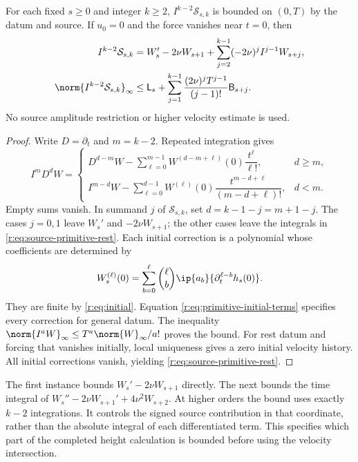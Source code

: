 \begin{proposition}
\label{r:prop:source-primitive}
For each fixed \(s\ge0\) and integer \(k\ge2\),
\(I^{k-2}\mathcal S_{s,k}\) is bounded on \((0,T)\) by the datum and
source. If \(u_0=0\) and the force vanishes near \(t=0\), then
\begin{equation}
 \begin{aligned}
 I^{k-2}\mathcal S_{s,k}
 &=W_s'-2\nu W_{s+1}
 +\sum_{j=2}^{k-1}(-2\nu)^jI^{j-1}W_{s+j},\\
 \norm{I^{k-2}\mathcal S_{s,k}}_\infty
 &\le\mathsf L_s+
 \sum_{j=1}^{k-1}\frac{(2\nu)^jT^{j-1}}{(j-1)!}\mathsf B_{s+j}.
 \end{aligned}
 \label{r:eq:source-primitive-rest}
\end{equation}
No source amplitude restriction or higher velocity estimate is used.
\end{proposition}

\begin{proof}
Write \(D=\partial_t\) and \(m=k-2\). Repeated integration gives
\begin{equation}
 I^mD^dW=
 \begin{cases}
 D^{d-m}W-\displaystyle\sum_{\ell=0}^{m-1}
 W^{(d-m+\ell)}(0)\dfrac{t^\ell}{\ell!},&d\ge m,\\[5pt]
 I^{m-d}W-\displaystyle\sum_{\ell=0}^{d-1}
 W^{(\ell)}(0)\dfrac{t^{m-d+\ell}}{(m-d+\ell)!},&d<m.
 \end{cases}
 \label{r:eq:primitive-initial-terms}
\end{equation}
Empty sums vanish. In summand \(j\) of \(\mathcal S_{s,k}\), set
\(d=k-1-j=m+1-j\). The cases \(j=0,1\) leave \(W_s'\) and
\(-2\nu W_{s+1}\); the other cases leave the integrals in
\eqref{r:eq:source-primitive-rest}. Each initial correction is a polynomial
whose coefficients are determined by
\[
 W_s^{(\ell)}(0)=\sum_{b=0}^{\ell}\binom\ell b
 \ip{a_b}{\partial_t^{\ell-b}h_s(0)}.
\]
They are finite by \eqref{r:eq:initial}. Equation
\eqref{r:eq:primitive-initial-terms} specifies every correction for general
datum. The inequality \(\norm{I^aW}_\infty\le T^a\norm{W}_\infty/a!\)
proves the bound. For rest datum and forcing that vanishes initially,
local uniqueness gives a zero initial velocity history. All initial
corrections vanish, yielding \eqref{r:eq:source-primitive-rest}.
\end{proof}

The first instance bounds \(W_s'-2\nu W_{s+1}\) directly. The next
bounds the time integral of
\(W_s''-2\nu W_{s+1}'+4\nu^2W_{s+2}\). At higher orders the bound
uses exactly \(k-2\) integrations. It controls the signed source
contribution in that coordinate, rather than the absolute integral of
each differentiated term. This specifies which part of the completed
height calculation is bounded before using the velocity intersection.

